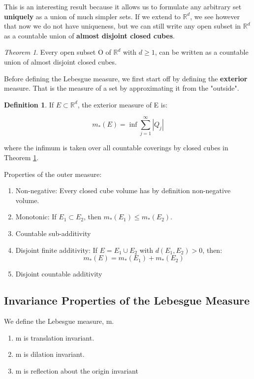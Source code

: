 \documentclass[class=article, crop=false]{standalone}
\theoremstyle{definition}
\newtheorem{definition}{Definition}[section]
\theoremstyle{remark}
\theoremstyle{lemma}
\theoremstyle{theorem}
\newtheorem*{theorem}{Theorem}
\theoremstyle{corollary}
\theoremstyle{property}
\begin{document}
		This is an interesting result because it allows us to formulate any arbitrary set \textbf{uniquely} as a union of much simpler sets. If we extend to $\mathbb{R}^d$, we see however that now we do not have uniqueness, but we can still write any open subset in $\mathbb{R}^d$ as a countable union of \textbf{almost disjoint closed cubes}.

		\begin{theorem}
		\label{thm:covering_countable_closed_cubes}
			Every open subset O of $\mathbb{R}^d$ with $d \ge 1$, can be written as a countable union of almost disjoint closed cubes.
		\end{theorem}

		Before defining the Lebesgue measure, we first start off by defining the \textbf{exterior} measure. That is the measure of a set by approximating it from the "outside". 

		\begin{definition}
		\label{def:exterior_measure}
			If $E \subset \mathbb{R}^d$, the exterior measure of E is:

				$$m_*(E) = \inf \sum_{j=1}^\infty |Q_j|$$

			where the infimum is taken over all countable coverings by closed cubes in Theorem \ref{thm:covering_countable_closed_cubes}.
		\end{definition}

		Properties of the outer measure:
		\begin{enumerate}
			\item Non-negative: Every closed cube volume has by definition non-negative volume.
			\item Monotonic: If $E_1 \subset E_2$, then $m_*(E_1) \le m_*(E_2)$.
			\item Countable sub-additivity
			\item Disjoint finite additivity: If $E = E_1 \cup E_2$ with $d(E_1, E_2) > 0$, then:
				$$m_*(E) = m_*(E_1) + m_*(E_2)$$
			\item Disjoint countable additivity
		\end{enumerate}

	\subsection{Invariance Properties of the Lebesgue Measure}
		We define the Lebesgue measure, m.

		\begin{enumerate}
			\item m is translation invariant.
			\item m is dilation invariant.
			\item m is reflection about the origin invariant
		\end{enumerate}
\end{document}
